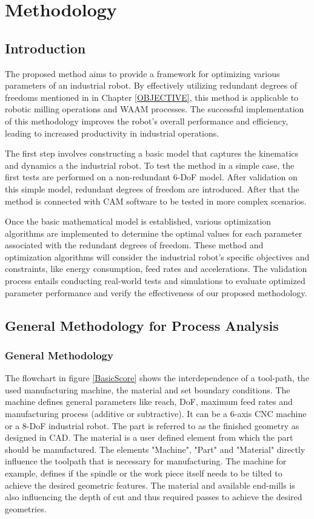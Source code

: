 \chapter{Methodology}%

\section{Introduction}%

The proposed method aims to provide a framework for optimizing various parameters of an industrial robot. By effectively utilizing redundant degrees of freedoms mentioned in in Chapter \ref{OBJECTIVE}, this method is applicable to robotic milling operations and WAAM processes. The successful implementation of this methodology improves the robot's overall performance and efficiency, leading to increased productivity in industrial operations.

The first step involves constructing a basic model that captures the kinematics and dynamics a the industrial robot. To test the method in a simple case, the first tests are performed on a non-redundant 6-DoF model. After validation on this simple model, redundant degrees of freedom are introduced. After that the method is connected with CAM software to be tested in more complex scenarios.

Once the basic mathematical model is established, various optimization algorithms are implemented to determine the optimal values for each parameter associated with the redundant degrees of freedom. These method and optimization algorithms will consider the industrial robot's specific objectives and constraints, like energy consumption, feed rates and accelerations. The validation process entails conducting real-world tests and simulations to evaluate optimized parameter performance and verify the effectiveness of our proposed methodology.


\section{General Methodology for Process Analysis}
\subsection{General Methodology}\label{general}

The flowchart in figure \ref{BasicScore} shows the interdependence of a tool-path, the used manufacturing machine, the material and set boundary conditions. The machine defines general parameters like reach, DoF, maximum feed rates and manufacturing process (additive or subtractive). It can be a 6-axis CNC machine or a 8-DoF industrial robot. The part is referred to as the finished geometry as designed in CAD. The material is a user defined element from which the part should be manufactured. The elements "Machine", "Part" and "Material" directly influence the toolpath that is necessary for manufacturing. The machine for example, defines if the spindle or the work piece itself needs to be tilted to achieve the desired geometric features. The material and available end-mills is also influencing the depth of cut and thus required passes to achieve the desired geometries. 


